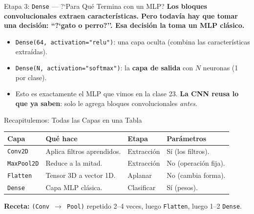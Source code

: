 \documentclass[aspectratio=169, 11pt]{beamer}
\begin{document}
\begin{frame}{Etapa 3: \texttt{Dense} --- ?`Para Qu\'e Termina con un MLP?}
  \vspace{6pt}
  {\footnotesize\color{arcaDark}\bfseries
    Los bloques convolucionales \textbf{extraen} caracter\'isticas.
    Pero todav\'ia hay que tomar una \textbf{decisi\'on}:
    ``?`gato o perro?''. Esa decisi\'on la toma un MLP cl\'asico.}

  \vspace{14pt}
  {\footnotesize
  \begin{itemize}\setlength{\itemsep}{6pt}
    \item[{\color{arcaRed}\scriptsize\faArrowRight}]
      \texttt{Dense(64, activation="relu")}: una capa oculta
      (combina las caracter\'isticas extra\'idas).
    \item[{\color{arcaRed}\scriptsize\faArrowRight}]
      \texttt{Dense(N, activation="softmax")}: la \textbf{capa de
      salida} con $N$ neuronas (1 por clase).
    \item[{\color{codeGreen}\scriptsize\faArrowRight}]
      Esto es exactamente el MLP que vimos en la clase 23.
      \textbf{La CNN reusa lo que ya saben}: solo le agrega bloques
      convolucionales \emph{antes}.
  \end{itemize}
  }
\end{frame}

\begin{frame}[shrink]{Recapitulemos: Todas las Capas en una Tabla}
  \vspace{6pt}
  {\footnotesize
  \begin{tabular}{@{}p{2.4cm} p{4.0cm} p{2.5cm} p{3.5cm}@{}}
    \toprule
    \textbf{Capa} & \textbf{Qu\'e hace} & \textbf{Etapa} & \textbf{Par\'ametros} \\
    \midrule
    \rowcolor{arcaGray}
    \texttt{Conv2D}
    & Aplica filtros aprendidos.
    & Extracci\'on
    & S\'i (los filtros). \\
    \texttt{MaxPool2D}
    & Reduce a la mitad.
    & Extracci\'on
    & No (operaci\'on fija). \\
    \rowcolor{arcaGray}
    \texttt{Flatten}
    & Tensor 3D a vector 1D.
    & Aplanar
    & No (cambia forma). \\
    \texttt{Dense}
    & Capa MLP cl\'asica.
    & Clasificar
    & S\'i (pesos). \\
    \bottomrule
  \end{tabular}
  }

  \vspace{14pt}
  \begin{tcolorbox}[colback=arcaGray, colframe=arcaRed, boxrule=0.5pt,
    arc=2pt, left=6pt, right=6pt, top=4pt, bottom=4pt]
    {\scriptsize\color{arcaDark}
    \faKey\hspace{4pt}\textbf{Receta:} \texttt{(Conv $\to$ Pool)} repetido
    2--4 veces, luego \texttt{Flatten}, luego 1--2 \texttt{Dense}.}
  \end{tcolorbox}
\end{frame}
\end{document}
